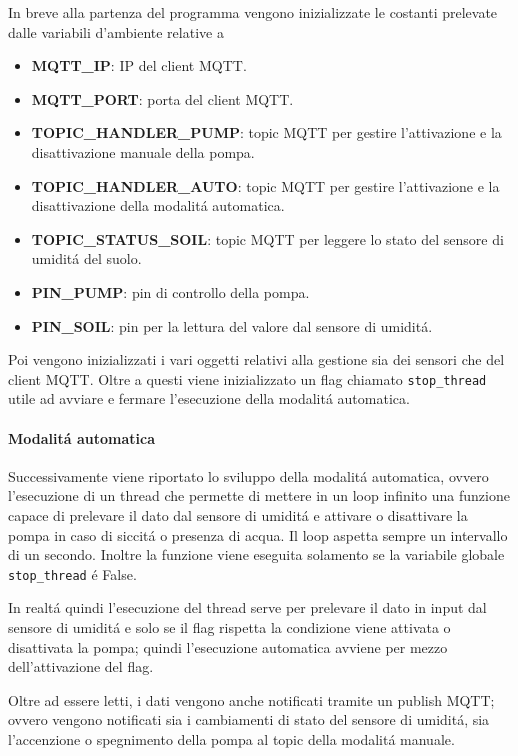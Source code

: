 In breve alla partenza del programma vengono inizializzate le costanti prelevate dalle variabili d'ambiente relative a 
\begin{itemize}
    \item \textbf{MQTT\_IP}: IP del client MQTT.
    \item \textbf{MQTT\_PORT}: porta del client MQTT.
    \item \textbf{TOPIC\_HANDLER\_PUMP}: topic MQTT per gestire l'attivazione e la disattivazione manuale della pompa.
    \item \textbf{TOPIC\_HANDLER\_AUTO}: topic MQTT per gestire l'attivazione e la disattivazione della modalit\'a automatica.
    \item \textbf{TOPIC\_STATUS\_SOIL}: topic MQTT per leggere lo stato del sensore di umidit\'a del suolo.
    \item \textbf{PIN\_PUMP}: pin di controllo della pompa.
    \item \textbf{PIN\_SOIL}: pin per la lettura del valore dal sensore di umidit\'a.
\end{itemize}

Poi vengono inizializzati i vari oggetti relativi alla gestione sia dei sensori che del client MQTT. Oltre a questi viene inizializzato un flag chiamato \texttt{stop\_thread} utile ad avviare e fermare l'esecuzione della modalit\'a automatica.

\paragraph{Modalit\'a automatica}
Successivamente viene riportato lo sviluppo della modalit\'a automatica, ovvero l'esecuzione di un thread che permette di mettere in un loop infinito una funzione capace di prelevare il dato dal sensore di umidit\'a e attivare o disattivare la pompa in caso di siccit\'a o presenza di acqua. Il loop aspetta sempre un intervallo di un secondo. Inoltre la funzione viene eseguita solamento se la variabile globale \texttt{stop\_thread} \'e False. 

In realt\'a quindi l'esecuzione del thread serve per prelevare il dato in input dal sensore di umidit\'a e solo se il flag rispetta la condizione viene attivata o disattivata la pompa; quindi l'esecuzione automatica avviene per mezzo dell'attivazione del flag.

Oltre ad essere letti, i dati vengono anche notificati tramite un publish MQTT; ovvero vengono notificati sia i cambiamenti di stato del sensore di umidit\'a, sia l'accenzione o spegnimento della pompa al topic della modalit\'a manuale.

